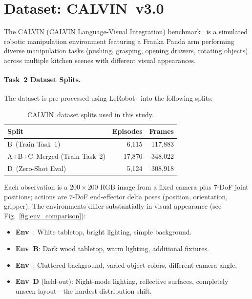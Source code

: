\documentclass[twoside,twocolumn,10pt]{article}
\newcommand{\dataset}{CALVIN}
\newcommand{\envB}{B}
\newcommand{\envABC}{A+B+C}
\newcommand{\envD}{D}
\begin{document}
\section{Dataset: \dataset~v3.0}

The \dataset{} (CALVIN Language-Visual Integration) benchmark~\cite{mees2022calvin}
is a simulated robotic manipulation environment featuring a Franka Panda arm
performing diverse manipulation tasks (pushing, grasping, opening drawers,
rotating objects) across multiple kitchen scenes with different visual
appearances.

\paragraph{Task~2 Dataset Splits.}
The dataset is pre-processed using LeRobot~\cite{lerobot} into the following
splits:

\begin{table}[H]
  \centering
  \caption{\dataset~dataset splits used in this study.}
  \label{tab:dataset}
  \begin{tabular}{lrr}
    \toprule
    Split & Episodes & Frames \\
    \midrule
    \envB~(Train Task~1)     & 6,115 & 117,883 \\
    \envABC~Merged (Train Task~2) & 17,870 & 348,022 \\
    \envD~(Zero-Shot Eval)   & 5,124 & 308,918 \\
    \bottomrule
  \end{tabular}
\end{table}

Each observation is a $200\times200$ RGB image from a fixed camera plus 7-DoF
joint positions; actions are 7-DoF end-effector delta poses (position,
orientation, gripper).  The environments differ substantially in visual
appearance (see Fig.~\ref{fig:env_comparison}):
\begin{itemize}[nosep]
  \item \textbf{Env~\envA}: White tabletop, bright lighting, simple background.
  \item \textbf{Env~\envB}: Dark wood tabletop, warm lighting, additional
        fixtures.
  \item \textbf{Env~\envC}: Cluttered background, varied object colors,
        different camera angle.
  \item \textbf{Env~\envD} (held-out): Night-mode lighting, reflective surfaces,
        completely unseen layout---the hardest distribution shift.
\end{itemize}
\end{document}
